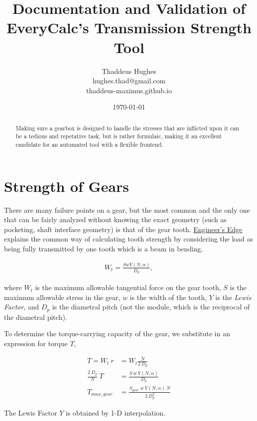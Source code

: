 \documentclass[10pt,letterpaper]{article}
\author{Thaddeus Hughes \\ hughes.thad@gmail.com \\ thaddeus-maximus.github.io}
\date{\today}
\title{Documentation and Validation of EveryCalc's Transmission Strength Tool}
\begin{document}
	\maketitle
	
	\begin{abstract}
		Making sure a gearbox is designed to handle the stresses that are inflicted upon it can be a tedious and repetative task, but is rather formulaic, making it an excellent candidate for an automated tool with a flexible frontend.
	\end{abstract}
	
\section{Strength of Gears}
	There are many failure points on a gear, but the most common and the only one that can be fairly analyzed without knowing the exact geometry (such as pocketing, shaft interface geometry) is that of the gear tooth.
	\href{https://www.engineersedge.com/gears/gear-tooth-strength.htm}{\underline{Engineer's Edge}} explains the common way of calculating tooth strength by considering the load as being fully transmitted by one tooth which is a beam in bending.

	\begin{align}
		W_t = \frac{S w Y(N,\alpha)}{D_p}, 
	\end{align}

	where $W_t$ is the maximum allowable tangential force on the gear tooth, $S$ is the maximum allowable stress in the gear, $w$ is the width of the tooth, $Y$ is the \textit{Lewis Factor}, and $D_{p}$ is the diametral pitch (not the module, which is the reciprocal of the diametral pitch).

	To determine the torque-carrying capacity of the gear, we substitute in an expression for torque $T$,

	\begin{align}
		T = W_t \ r &= W_t \frac{N}{2 \ D_p} \\
		\frac{2 \ D_p}{N} \ T &= \frac{S \ w \ Y(N,\alpha)}{D_p} \\
		T_{max, gear} &= \frac{S_{gear} \ w \ Y(N,\alpha) \ N}{2 \ D_p^2}
	\end{align}

	The Lewis Factor $Y$ is obtained by 1-D interpolation.
\end{document}
